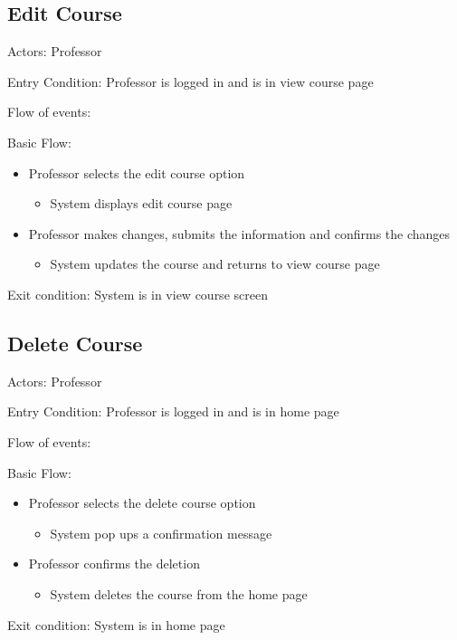 \subsection*{Edit Course}\label{section:h.vwpc5v6194kl}
Actors: Professor

Entry Condition: Professor is logged in and is in view course 
page

Flow of events:

Basic Flow:

\begin{itemize}
\item Professor selects the edit course option
\begin{itemize}
\item System displays edit course page
\end{itemize}
\item Professor makes changes, submits the information and confirms the 
changes
\begin{itemize}
\item System updates the course and returns to view course page
\end{itemize}
\end{itemize}
Exit condition: System is in view course screen

\subsection*{Delete Course}\label{section:h.u6yi7m9pwom7}
Actors: Professor

Entry Condition: Professor is logged in and is in home page

Flow of events:

Basic Flow:

\begin{itemize}
\item Professor selects the delete course option
\begin{itemize}
\item System pop ups a confirmation message
\end{itemize}
\item Professor confirms the deletion
\begin{itemize}
\item System deletes the course from the home page
\end{itemize}
\end{itemize}

Exit condition: System is in home page



